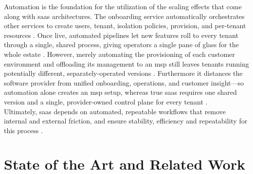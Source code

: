 \documentclass[11pt, a4paper, oneside, listof=totoc]{scrartcl}
\begin{document}
            Automation is the foundation for the utilization of the scaling effects that come along
            with \gls{saas} architectures.
            The onboarding service automatically orchestrates other services to
            create users, tenant, isolation policies, provision, and per-tenant resources
            \parencite[p.~14]{awsSaaSArchitectureFundamentals}.
            Once live, automated pipelines let new features roll to every tenant through a single,
            shared process, giving operators a single pane of glass for the whole estate
            \parencite[p.~10]{awsSaaSArchitectureFundamentals}.
            However, merely automating the provisioning of each customer environment and offloading
            its management to an \gls{msp} still leaves tenants running potentially different,
            separately-operated versions \parencite[pp.~23--24]{awsSaaSArchitectureFundamentals}.
            Furthermore it distances the software provider from unified onboarding, operations, and
            customer insight—so automation alone creates an \gls{msp} setup, whereas true \gls{saas}
            requires one shared version and a single, provider-owned control plane for every tenant
            \parencite[pp.~23--24]{awsSaaSArchitectureFundamentals}.
            \\
            Ultimately, \gls{saas} depends on automated, repeatable workflows that remove internal
            and external friction, and ensure stability, efficiency and repeatability for this
            process \parencite[p.~14]{awsSaaSArchitectureFundamentals}.

    \section{State of the Art and Related Work}\label{sec:related}
\end{document}
